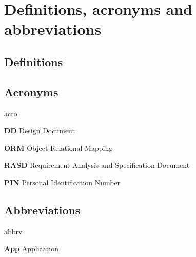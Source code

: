 
\section{Definitions, acronyms and abbreviations}

\subsection{Definitions}

\subsection{Acronyms}
	\begin{labeling}{acro}
		\item[\textbf{DD}] Design Document
		\item[\textbf{ORM}] Object-Relational Mapping
		\item[\textbf{RASD}] Requirement Analysis and Specification Document
		\item[\textbf{PIN}] Personal Identification Number
	\end{labeling}

\subsection{Abbreviations}
	\begin{labeling}{abbrv}
		\item[\textbf{App}] Application
	\end{labeling}
